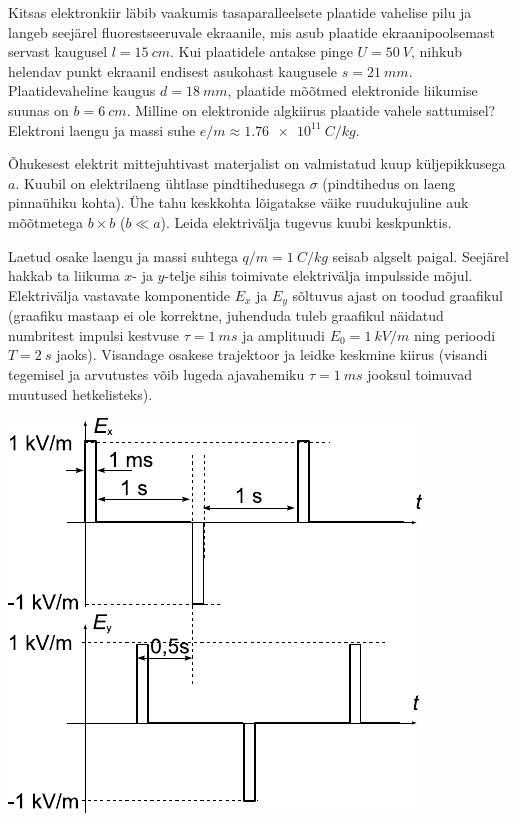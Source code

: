 \documentclass[10pt, twoside]{article}
\begin{document}
{%

Kitsas elektronkiir läbib vaakumis tasaparalleelsete plaatide vahelise pilu ja langeb seejärel fluorestseeruvale ekraanile, mis asub plaatide ekraanipoolsemast servast kaugusel $l = \SI{15}{cm}$. Kui plaatidele antakse pinge $U = \SI{50}{V}$, nihkub helendav punkt ekraanil endisest asukohast kaugusele $s = \SI{21}{mm}$. Plaatidevaheline kaugus $d = \SI{18}{mm}$, plaatide mõõtmed elektronide liikumise suunas on $b = \SI{6}{cm}$. Milline on elektronide algkiirus plaatide vahele sattumisel? Elektroni laengu ja massi suhe $e/m \approx \SI{1,76e11}{C/kg}$.
\probend
\bigskip


Õhukesest elektrit mittejuhtivast materjalist on valmistatud kuup küljepikkusega $a$. Kuubil on elektrilaeng ühtlase pindtihedusega $\sigma$ (pindtihedus on laeng pinnaühiku kohta). Ühe tahu keskkohta lõigatakse väike ruudukujuline auk mõõtmetega $b \times b$ ($b \ll a$). Leida elektrivälja tugevus kuubi keskpunktis.
\probend
\bigskip


Laetud osake laengu ja massi suhtega $q/m = \SI{1}{C/kg}$ seisab algselt paigal. Seejärel hakkab ta liikuma $x$- ja $y$-telje sihis
toimivate elektrivälja impulsside mõjul. Elektrivälja vastavate komponentide $E_x$ ja $E_y$ sõltuvus ajast on toodud graafikul (graafiku mastaap
ei ole korrektne, juhenduda tuleb graafikul näidatud numbritest impulsi
kestvuse $\tau = \SI{1}{ms}$ ja amplituudi $E_0 = \SI{1}{kV/m}$ ning perioodi $T = \SI{2}{s}$
jaoks). Visandage osakese trajektoor ja leidke keskmine kiirus (visandi tegemisel ja arvutustes võib lugeda ajavahemiku $\tau = \SI{1}{ms}$ jooksul
toimuvad muutused hetkelisteks). 

\begin{center}
	\includegraphics[width=0.6\linewidth]{2009-v2g-06-yl}
\end{center}
\probend
\bigskip

}
\end{document}
